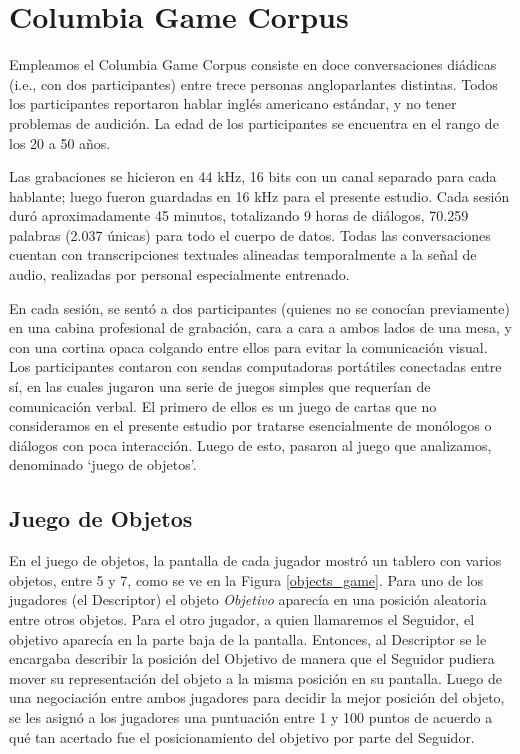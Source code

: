\section{Columbia Game Corpus}

\newcommand{\objectgame} {\emph{Juego de objetos}}


Empleamos el Columbia Game Corpus  \cite{GRAV2009} consiste en doce conversaciones diádicas (i.e., con dos participantes) entre trece personas angloparlantes distintas. Todos los participantes reportaron hablar inglés americano estándar, y no tener problemas de audición. La edad de los participantes se encuentra en el rango de los 20 a 50 años.

Las grabaciones se hicieron en 44 kHz, 16 bits con un canal separado para cada hablante; luego fueron guardadas en 16 kHz para el presente estudio. Cada sesión duró aproximadamente 45 minutos, totalizando 9 horas de
diálogos, 70.259 palabras (2.037 únicas) para todo el cuerpo de datos. Todas las conversaciones cuentan con transcripciones textuales alineadas temporalmente a la señal de audio, realizadas por personal especialmente entrenado.

En cada sesión, se sentó a dos participantes (quienes no se conocían previamente) en una cabina profesional de grabación, cara a cara a ambos lados de una mesa, y con una cortina opaca colgando entre ellos para evitar la comunicación visual. Los participantes contaron con sendas computadoras portátiles conectadas entre sí, en las cuales jugaron una serie de juegos simples que requerían de comunicación verbal. El primero de ellos es un juego de cartas que no consideramos en el presente estudio por tratarse esencialmente de monólogos o diálogos con poca interacción. Luego de esto, pasaron al juego que analizamos, denominado `juego de objetos'.

\subsection{Juego de Objetos}

En el juego de objetos, la pantalla de cada jugador mostró un tablero con varios objetos, entre 5 y 7, como se ve en la Figura \ref{objects_game}.
Para uno de los jugadores (el Descriptor) el objeto \emph{Objetivo} aparecía en una posición aleatoria entre otros objetos. Para el otro jugador, a quien llamaremos el Seguidor, el objetivo aparecía en la parte baja de la pantalla. Entonces, al Descriptor se le encargaba describir la posición del Objetivo de manera que el Seguidor pudiera mover su representación del objeto a la misma posición en su pantalla. Luego de una negociación entre ambos jugadores para decidir la mejor posición del objeto, se les asignó a los jugadores una puntuación entre 1 y 100 puntos de acuerdo a qué tan acertado fue el posicionamiento del objetivo por parte del Seguidor.

